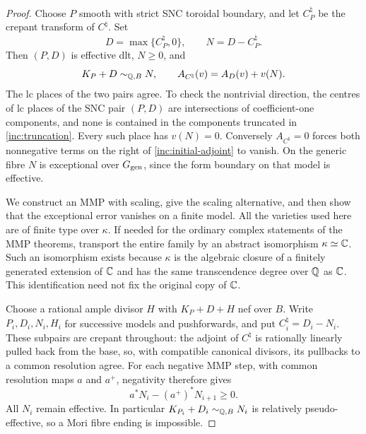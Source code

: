\begin{proof}
Choose $P$ smooth with strict SNC toroidal boundary, and let
$C_P^\natural$ be the crepant transform of $C^\natural$.  Set
\begin{equation}\label{inc:truncation}
 D=\max\{C_P^\natural,0\},\qquad
 N=D-C_P^\natural.
\end{equation}
Then $(P,D)$ is effective dlt, $N\geq0$, and
\begin{equation}\label{inc:initial-adjoint}
 K_P+D\sim_{\mathbb Q,B}N,
 \qquad A_{C^\natural}(v)=A_D(v)+v(N).
\end{equation}
The lc places of the two pairs agree.  To check the nontrivial direction,
the centres of lc places of the SNC pair $(P,D)$ are intersections of
coefficient-one components, and none is contained in the components
truncated in \eqref{inc:truncation}.  Every such place has $v(N)=0$.
Conversely $A_{C^\natural}=0$ forces both nonnegative terms on the
right of \eqref{inc:initial-adjoint} to vanish.  On the generic fibre
$N$ is exceptional over $G_{\rm gen}$, since the form boundary on that
model is effective.

We construct an MMP with scaling, give the scaling alternative, and
then show that the exceptional error vanishes on a finite model.  All
the varieties used here are of finite type over $\kappa$.  If needed
for the ordinary complex statements of the MMP theorems, transport
the entire family by an abstract isomorphism $\kappa\simeq\mathbb C$.
Such an isomorphism exists because $\kappa$ is the algebraic closure of
a finitely generated extension of $\mathbb C$ and has the same transcendence
degree over $\mathbb Q$ as $\mathbb C$.  This identification need not fix the original
copy of $\mathbb C$.

Choose a rational ample divisor $H$ with $K_P+D+H$ nef over $B$.
Write $P_i,D_i,N_i,H_i$ for successive models and pushforwards, and
put $C_i^\natural=D_i-N_i$.  These subpairs are crepant throughout:
the adjoint of $C^\natural$ is rationally linearly pulled back from
the base, so, with compatible canonical divisors, its pullbacks to a
common resolution agree.  For each negative MMP step, with common
resolution maps $a$ and $a^+$, negativity therefore gives
\begin{equation}\label{inc:decreasing-pulls}
 a^*N_i-(a^+)^*N_{i+1}\geq0.
\end{equation}
All $N_i$ remain effective.  In particular
$K_{P_i}+D_i\sim_{\mathbb Q,B}N_i$ is relatively pseudo-effective, so a Mori
fibre ending is impossible.


\end{proof}
